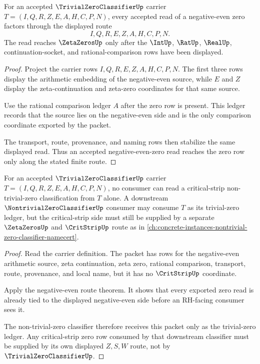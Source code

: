 \begin{theorem}
\label{thm:trivial-zero-classifier-negative-even-route}
For an accepted $\TrivialZeroClassifierUp$ carrier $T=(I,Q,R,Z,E,A,H,C,P,N)$, every accepted read of a negative-even zero factors through the displayed route
$$
I,Q,R,E,Z,A,H,C,P,N.
$$
The read reaches $\ZetaZerosUp$ only after the $\IntUp$, $\RatUp$, $\RealUp$, continuation-socket, and rational-comparison rows have been displayed.
\end{theorem}
\begin{proof}
Project the carrier rows $I,Q,R,E,Z,A,H,C,P,N$. The first three rows display the arithmetic embedding of the negative-even source, while $E$ and $Z$ display the zeta-continuation and zeta-zero coordinates for that same source.

Use the rational comparison ledger $A$ after the zero row is present. This ledger records that the source lies on the negative-even side and is the only comparison coordinate exported by the packet.

The transport, route, provenance, and naming rows then stabilize the same displayed read. Thus an accepted negative-even-zero read reaches the zero row only along the stated finite route.
\end{proof}

\begin{theorem}
\label{thm:trivial-zero-classifier-nontrivial-separation}
For an accepted $\TrivialZeroClassifierUp$ carrier $T=(I,Q,R,Z,E,A,H,C,P,N)$, no consumer can read a critical-strip non-trivial-zero classification from $T$ alone. A downstream $\NontrivialZeroClassifierUp$ consumer may consume $T$ as its trivial-zero ledger, but the critical-strip side must still be supplied by a separate $\ZetaZerosUp$ and $\CritStripUp$ route as in \autoref{ch:concrete-instances-nontrivial-zero-classifier-namecert}.
\end{theorem}
\begin{proof}
Read the carrier definition. The packet has rows for the negative-even arithmetic source, zeta continuation, zeta zero, rational comparison, transport, route, provenance, and local name, but it has no $\CritStripUp$ coordinate.

Apply the negative-even route theorem. It shows that every exported zero read is already tied to the displayed negative-even side before an RH-facing consumer sees it.

The non-trivial-zero classifier therefore receives this packet only as the trivial-zero ledger. Any critical-strip zero row consumed by that downstream classifier must be supplied by its own displayed $Z,S,W$ route, not by $\TrivialZeroClassifierUp$.
\end{proof}

